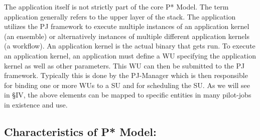 \documentclass[conference,final]{IEEEtran}
\newcommand{\jhanote}[1]{ {\textcolor{red} { ***shantenu: #1 }}}
\newcommand{\alnote}[1]{ {\textcolor{blue} { ***andre: #1 }}}
\newcommand{\alnote}[1]{}
\newcommand{\jhanote}[1]{}
\newcommand{\upp}{\vspace*{-0.5em}}
\begin{document}
\begin{compactitem}
  



\end{compactitem}

The application itself is not strictly part of the core P* Model. The
term application generally refers to the upper layer of the stack. The
application utilizes the PJ framework to execute multiple instances of
an application kernel (an ensemble) or alternatively instances of
multiple different application kernels (a workflow). An application
kernel is the actual binary that gets run.  To execute an application
kernel, an application must define a WU specifying the application
kernel as well as other parameters. This WU can then be submitted to
the PJ framework. Typically this is done by the PJ-Manager which is
then responsible for binding one or more WUs to a SU and for
scheduling the SU.	
As we will see in \S{IV}, the above elements can be mapped to specific
entities in many pilot-jobs in existence and use.

 

% 
% 


\subsection{Characteristics of P* Model:\upp\upp}
\label{sec:p_star_elements}
\end{document}
